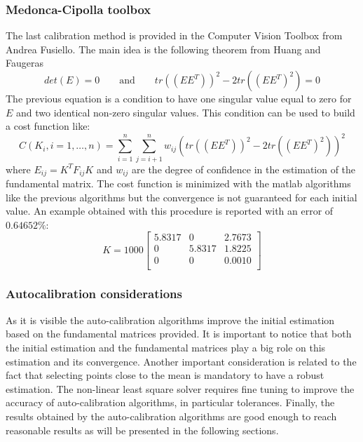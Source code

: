 \documentclass[11pt]{article}
\begin{document}
\subsubsection{Medonca-Cipolla toolbox}
The last calibration method is provided in the Computer Vision Toolbox from Andrea Fusiello. The main idea is the following theorem from Huang and Faugeras \cite{Faugeras89}
\begin{equation}
    det(E) = 0 \qquad \text{and} \qquad tr((EE^T))^2 - 2 tr((EE^T)^2) = 0
\end{equation}
The previous equation is a condition to have one singular value equal to zero for $E$ and two identical non-zero singular values. This condition can be used to build a cost function like:
\begin{equation}
    C(K_i, i = 1,\dots, n) = \sum_{i=1}^{n} \sum_{j=i+1}^{n} w_{ij} (tr((EE^T))^2 - 2 tr((EE^T)^2))^2
\end{equation}
where $E_{ij} = K^TF_{ij}K$ and $w_{ij}$ are the degree of confidence in the estimation of the fundamental matrix. The cost function is minimized with the matlab algorithms like the previous algorithms but the convergence is not guaranteed for each initial value. An example obtained with this procedure is reported with an error of $0.64652\%$:
\begin{equation}
    K = 1000 \begin{bmatrix}
     5.8317  &       0   & 2.7673\\
          0  &  5.8317   & 1.8225\\
          0  &       0   & 0.0010\\ 
\end{bmatrix}
\end{equation}

\bigskip
\subsubsection{Autocalibration considerations}
As it is visible the auto-calibration algorithms improve the initial estimation based on the fundamental matrices provided. It is important to notice that both the initial estimation and the fundamental matrices play a big role on this estimation and its convergence. Another important consideration is related to the fact that selecting points close to the mean is mandatory to have a robust estimation. The non-linear least square solver requires fine tuning to improve the accuracy of auto-calibration algorithms, in particular tolerances. Finally, the results obtained by the auto-calibration algorithms are good enough to reach reasonable results as will be presented in the following sections.
\end{document}
